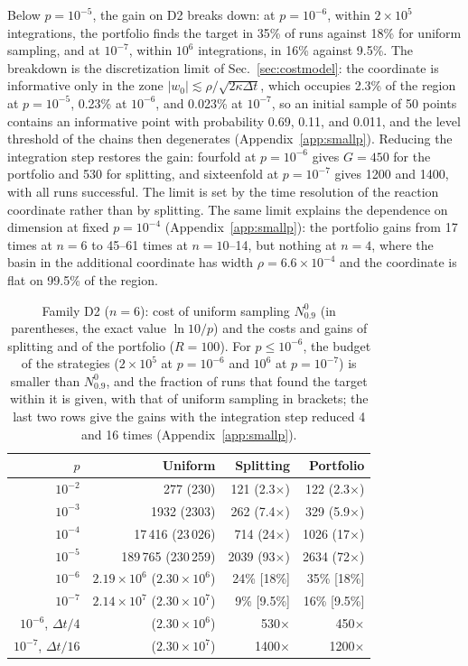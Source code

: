 Below $p=10^{-5}$, the gain on D2 breaks down: at $p=10^{-6}$, within $2\times10^5$ integrations, the portfolio finds the target in 35\% of runs against 18\% for uniform sampling, and at $10^{-7}$, within $10^6$ integrations, in 16\% against 9.5\%. The breakdown is the discretization limit of Sec.~\ref{sec:costmodel}: the coordinate is informative only in the zone $|w_0|\lesssim\rho/\sqrt{2\kappa\Delta t}$, which occupies 2.3\% of the region at $p=10^{-5}$, 0.23\% at $10^{-6}$, and 0.023\% at $10^{-7}$, so an initial sample of 50 points contains an informative point with probability 0.69, 0.11, and 0.011, and the level threshold of the chains then degenerates (Appendix~\ref{app:smallp}). Reducing the integration step restores the gain: fourfold at $p=10^{-6}$ gives $G=450$ for the portfolio and 530 for splitting, and sixteenfold at $p=10^{-7}$ gives 1200 and 1400, with all runs successful. The limit is set by the time resolution of the reaction coordinate rather than by splitting. The same limit explains the dependence on dimension at fixed $p=10^{-4}$ (Appendix~\ref{app:smallp}): the portfolio gains from 17 times at $n=6$ to 45--61 times at $n=10$--14, but nothing at $n=4$, where the basin in the additional coordinate has width $\rho=6.6\times10^{-4}$ and the coordinate is flat on 99.5\% of the region.

\begin{table}
\caption{Family D2 ($n=6$): cost of uniform sampling $N^0_{0.9}$ (in parentheses, the exact value $\ln10/p$) and the costs and gains of splitting and of the portfolio ($R=100$). For $p\le10^{-6}$, the budget of the strategies ($2\times10^5$ at $p=10^{-6}$ and $10^6$ at $p=10^{-7}$) is smaller than $N^0_{0.9}$, and the fraction of runs that found the target within it is given, with that of uniform sampling in brackets; the last two rows give the gains with the integration step reduced 4 and 16 times (Appendix~\ref{app:smallp}).}
\label{tab:scaling}
\footnotesize
\begin{ruledtabular}
\begin{tabular}{rrrr}
$p$ & Uniform & Splitting & Portfolio \\
\hline
$10^{-2}$ & 277 (230) & 121 (2.3$\times$) & 122 (2.3$\times$) \\
$10^{-3}$ & 1932 (2303) & 262 (7.4$\times$) & 329 (5.9$\times$) \\
$10^{-4}$ & 17\,416 (23\,026) & 714 (24$\times$) & 1026 (17$\times$) \\
$10^{-5}$ & 189\,765 (230\,259) & 2039 (93$\times$) & 2634 (72$\times$) \\
$10^{-6}$ & $2.19\times10^{6}$ ($2.30\times10^{6}$) & 24\% [18\%] & 35\% [18\%] \\
$10^{-7}$ & $2.14\times10^{7}$ ($2.30\times10^{7}$) & 9\% [9.5\%] & 16\% [9.5\%] \\
$10^{-6}$, $\Delta t/4$ & ($2.30\times10^{6}$) & 530$\times$ & 450$\times$ \\
$10^{-7}$, $\Delta t/16$ & ($2.30\times10^{7}$) & 1400$\times$ & 1200$\times$ \\
\end{tabular}
\end{ruledtabular}
\end{table}


